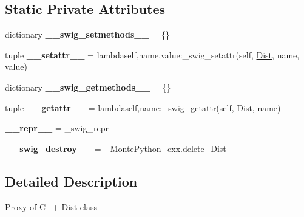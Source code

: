 \subsection*{Static Private Attributes}
\begin{DoxyCompactItemize}
\item 
\hypertarget{classMontePython__cxx_1_1Dist_acd9b935c74e8df2e3380b8f72cc3c19f}{}dictionary {\bfseries \+\_\+\+\_\+swig\+\_\+setmethods\+\_\+\+\_\+} = \{\}\label{classMontePython__cxx_1_1Dist_acd9b935c74e8df2e3380b8f72cc3c19f}

\item 
\hypertarget{classMontePython__cxx_1_1Dist_a12aa3c9146a49d6708e5c58215090139}{}tuple {\bfseries \+\_\+\+\_\+setattr\+\_\+\+\_\+} = lambdaself,name,value\+:\+\_\+swig\+\_\+setattr(self, \hyperlink{classMontePython__cxx_1_1Dist}{Dist}, name, value)\label{classMontePython__cxx_1_1Dist_a12aa3c9146a49d6708e5c58215090139}

\item 
\hypertarget{classMontePython__cxx_1_1Dist_a95e97f322b4bf5a748f0e92cbc771665}{}dictionary {\bfseries \+\_\+\+\_\+swig\+\_\+getmethods\+\_\+\+\_\+} = \{\}\label{classMontePython__cxx_1_1Dist_a95e97f322b4bf5a748f0e92cbc771665}

\item 
\hypertarget{classMontePython__cxx_1_1Dist_a4a1697eb64141a1bd636b41b27fdb17b}{}tuple {\bfseries \+\_\+\+\_\+getattr\+\_\+\+\_\+} = lambdaself,name\+:\+\_\+swig\+\_\+getattr(self, \hyperlink{classMontePython__cxx_1_1Dist}{Dist}, name)\label{classMontePython__cxx_1_1Dist_a4a1697eb64141a1bd636b41b27fdb17b}

\item 
\hypertarget{classMontePython__cxx_1_1Dist_a26520ef017a9f08c26a5c4cfde0b0217}{}{\bfseries \+\_\+\+\_\+repr\+\_\+\+\_\+} = \+\_\+swig\+\_\+repr\label{classMontePython__cxx_1_1Dist_a26520ef017a9f08c26a5c4cfde0b0217}

\item 
\hypertarget{classMontePython__cxx_1_1Dist_a61e6995208c0ffc17d1bb646b031e827}{}{\bfseries \+\_\+\+\_\+swig\+\_\+destroy\+\_\+\+\_\+} = \+\_\+\+Monte\+Python\+\_\+cxx.\+delete\+\_\+\+Dist\label{classMontePython__cxx_1_1Dist_a61e6995208c0ffc17d1bb646b031e827}

\end{DoxyCompactItemize}


\subsection{Detailed Description}
\begin{DoxyVerb}Proxy of C++ Dist class\end{DoxyVerb}
 

